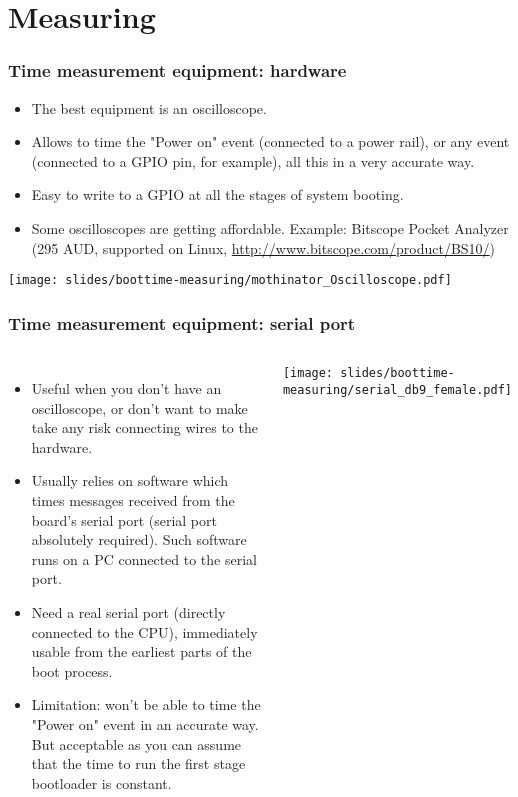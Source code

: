 \section{Measuring}

\begin{frame}
\frametitle{Time measurement equipment: hardware}
\begin{itemize}
\item The best equipment is an oscilloscope.
\item Allows to time the "Power on" event (connected to a power rail),
      or any event (connected to a GPIO pin, for example), all this
      in a very accurate way.
\item Easy to write to a GPIO at all the stages of system booting.
\item Some oscilloscopes are getting affordable. Example: Bitscope
      Pocket Analyzer (295 AUD, supported on Linux, \url{http://www.bitscope.com/product/BS10/})
\end{itemize}
\begin{center}
    \texttt{[image: slides/boottime-measuring/mothinator\_Oscilloscope.pdf]}
\end{center}
\end{frame}

\begin{frame}
\frametitle{Time measurement equipment: serial port}
\begin{columns}
\begin{itemize}
\item Useful when you don't have an oscilloscope, or don't want to make
      take any risk connecting wires to the hardware.
\item Usually relies on software which times messages received from the board's
      serial port (serial port absolutely required). Such software 
      runs on a PC connected to the serial port. 
\item Need a real serial port (directly connected to the CPU),
      immediately usable from the earliest parts of the boot process.
\item Limitation: won't be able to time the "Power on" event in
      an accurate way. But acceptable as you can assume that
      the time to run the first stage bootloader is constant.
\end{itemize}
\texttt{[image: slides/boottime-measuring/serial\_db9\_female.pdf]}
\end{columns}
\end{frame}

